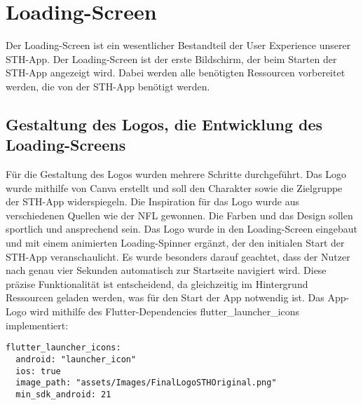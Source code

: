 \section{Loading-Screen}
Der Loading-Screen ist ein wesentlicher Bestandteil der User Experience unserer STH-App. Der Loading-Screen ist der erste Bildschirm, der beim Starten der STH-App angezeigt wird. Dabei werden alle benötigten Ressourcen vorbereitet werden, die von der STH-App benötigt werden.

\subsection{Gestaltung des Logos, die Entwicklung des Loading-Screens}
Für die Gestaltung des Logos wurden mehrere Schritte durchgeführt. Das Logo wurde mithilfe von Canva erstellt und soll den Charakter sowie die Zielgruppe der STH-App widerspiegeln.
Die Inspiration für das Logo wurde aus verschiedenen Quellen wie der NFL gewonnen. Die Farben und das Design sollen sportlich und ansprechend sein.
Das Logo wurde in den Loading-Screen eingebaut und mit einem animierten Loading-Spinner ergänzt, der den initialen Start der STH-App veranschaulicht. 
Es wurde besonders darauf geachtet, dass der Nutzer nach genau vier Sekunden automatisch zur Startseite navigiert wird. Diese präzise Funktionalität ist entscheidend, da gleichzeitig im Hintergrund Ressourcen geladen werden, was für den Start der App notwendig ist.
Das App-Logo wird mithilfe des Flutter-Dependencies flutter\_launcher\_icons implementiert:
\begin{verbatim}
flutter_launcher_icons:
  android: "launcher_icon"
  ios: true
  image_path: "assets/Images/FinalLogoSTHOriginal.png"
  min_sdk_android: 21
\end{verbatim}
